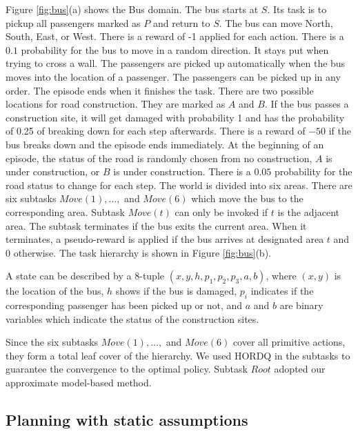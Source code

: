 Figure \ref{fig:bus}(a) shows the Bus domain. The bus starts at $S$. Its task
is to pickup all passengers marked as $P$ and return to $S$.
The bus can move North, South, East, or West. There is a reward of -1 applied for each action.
There is a $0.1$ probability for the bus to move in a random direction. It stays put 
when trying to cross a wall. 
The passengers are picked up automatically when the bus moves into
the location of a passenger. The passengers can be picked up in any order.
The episode ends when it finishes the task.  
There are two possible locations for road construction. They are marked as 
$A$ and $B$. If the bus passes a construction site, it will get damaged with probability 1 and has the probability
of 0.25 of breaking down for each step afterwards. There is a reward of $-50$ if the bus breaks down and the episode ends immediately. 
At the beginning of an episode, the status of the road is randomly chosen from no construction, $A$ is under construction,
or $B$ is under construction. There is a $0.05$ probability for the road status to change for each step.
The world is divided into six areas. There are six subtasks $Move(1), \dots,$ and $Move(6)$ which move the
bus to the corresponding area.
Subtask $Move(t)$ can only be invoked if $t$ is the adjacent area.
The subtask terminates if the bus exits the current area.
When it terminates, a pseudo-reward is applied if the bus arrives at designated area $t$ and 0 otherwise.
The task hierarchy is shown in Figure \ref{fig:bus}(b). 

A state can be described by a 8-tuple $(x, y, h, p_1, p_2, p_3, a, b)$, where $(x, y)$ is the location of the bus, $h$ shows if the bus is damaged, $p_i$ indicates if the corresponding passenger has been picked up or not,
and $a$ and $b$ are binary variables which indicate the status of the construction sites.

Since the six subtasks $Move(1), \dots,$ and $Move(6)$ cover all primitive actions, they form a total leaf cover of the hierarchy.
We used HORDQ in the subtasks to guarantee the convergence to the optimal
policy. Subtask $Root$ adopted our approximate model-based method. 


\subsection{Planning with static assumptions}
\label{se:Model}


